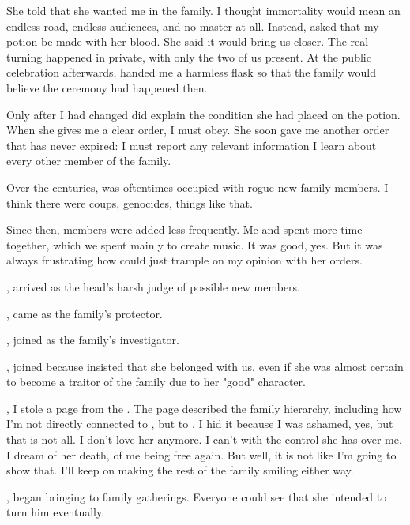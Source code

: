 {She told  that she wanted me in the family. I thought immortality would mean an endless road, endless audiences, and no master at all. Instead,  asked that my potion be made with her blood. She said it would bring us closer. The real turning happened in private, with only the two of us present. At the public celebration afterwards,  handed me a harmless flask so that the family would believe the ceremony had happened then.

Only after I had changed did  explain the condition she had placed on the potion. When she gives me a clear order, I must obey. She soon gave me another order that has never expired: I must report any relevant information I learn about every other member of the family.

Over the centuries,  was oftentimes occupied with rogue new family members. I think there were coups, genocides, things like that.

Since then, members were added less frequently. Me and  spent more time together, which we spent mainly to create music. It was good, yes. But it was always frustrating how  could just trample on my opinion with her orders.

,  arrived as the head's harsh judge of possible new members.

,  came as the family's protector.

,  joined as the family's investigator.

,  joined because  insisted that she belonged with us, even if she was almost certain to become a traitor of the family due to her "good" character.

, I stole a page from the . The page described the family hierarchy, including how I'm not directly connected to , but to . I hid it because I was ashamed, yes, but that is not all. I don't love her anymore. I can't with the control she has over me. I dream of her death, of me being free again. But well, it is not like I'm going to show that. I'll keep on making the rest of the family smiling either way.

,  began bringing  to family gatherings. Everyone could see that she intended to turn him eventually.

}
